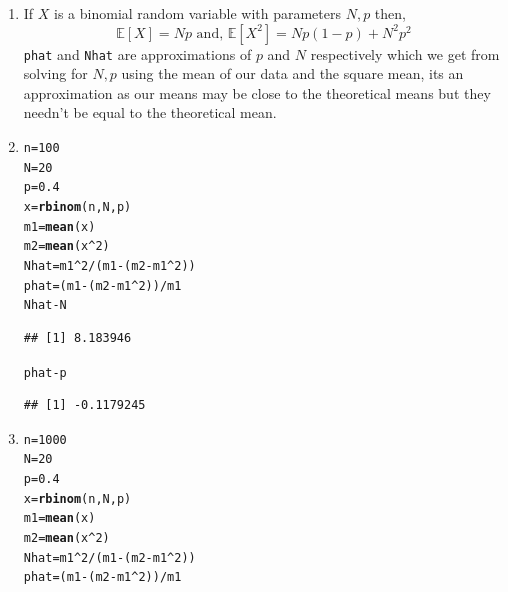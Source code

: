 \documentclass[11pt]{article}\usepackage[]{graphicx}\usepackage[dvipsnames]{xcolor}
\makeatletter
\newcommand{\hlnum}[1]{\textcolor[rgb]{0.686,0.059,0.569}{#1}}%
\newcommand{\hlopt}[1]{\textcolor[rgb]{0,0,0}{#1}}%
\newcommand{\hldef}[1]{\textcolor[rgb]{0.345,0.345,0.345}{#1}}%
\newcommand{\hlkwb}[1]{\textcolor[rgb]{0.69,0.353,0.396}{#1}}%
\newcommand{\hlkwd}[1]{\textcolor[rgb]{0.737,0.353,0.396}{\textbf{#1}}}%
\newenvironment{kframe}{%
 \def\at@end@of@kframe{}%
 \ifinner\ifhmode%
  \def\at@end@of@kframe{\end{minipage}}%
  \begin{minipage}{\columnwidth}%
 \fi\fi%
 \def\FrameCommand##1{\hskip\@totalleftmargin \hskip-\fboxsep
 \colorbox{shadecolor}{##1}\hskip-\fboxsep
     \hskip-\linewidth \hskip-\@totalleftmargin \hskip\columnwidth}%
 \MakeFramed {\advance\hsize-\width
   \@totalleftmargin\z@ \linewidth\hsize
   \@setminipage}}%
 {\par\unskip\endMakeFramed%
 \at@end@of@kframe}
\newenvironment{knitrout}{}{} %
\theoremstyle{problemstyle}
\makeatother
\begin{document}
\begin{enumerate}[label=\arabic*.]
\begin{enumerate}[label=(\alph*)]
        \item[(0)] If $X$ is a binomial random variable with parameters $N,p$ then,
        $$\mathbb{E}[X]=Np\text{ and, }\mathbb{E}[X^2]=Np(1-p)+N^2p^2$$
        \texttt{phat} and \texttt{Nhat} are approximations of $p$ and $N$ respectively which we get from solving for $N,p$ using the mean of our data and the square mean, its an approximation as our means may be close to the theoretical means but they needn't be equal to the theoretical mean.
        \item 
\begin{knitrout}
\color{fgcolor}\begin{kframe}
\begin{alltt}
\hldef{n} \hlkwb{=} \hlnum{100}
\hldef{N} \hlkwb{=} \hlnum{20}
\hldef{p} \hlkwb{=} \hlnum{0.4}
\hldef{x} \hlkwb{=} \hlkwd{rbinom}\hldef{(n,N,p)}
\hldef{m1} \hlkwb{=} \hlkwd{mean}\hldef{(x)}
\hldef{m2} \hlkwb{=} \hlkwd{mean}\hldef{(x}\hlopt{^}\hlnum{2}\hldef{)}
\hldef{Nhat} \hlkwb{=} \hldef{m1}\hlopt{^}\hlnum{2} \hlopt{/} \hldef{(m1} \hlopt{-} \hldef{(m2} \hlopt{-} \hldef{m1}\hlopt{^}\hlnum{2}\hldef{))}
\hldef{phat} \hlkwb{=} \hldef{(m1} \hlopt{-} \hldef{(m2} \hlopt{-} \hldef{m1}\hlopt{^}\hlnum{2}\hldef{))} \hlopt{/} \hldef{m1}
\hldef{Nhat} \hlopt{-} \hldef{N}
\end{alltt}
\begin{verbatim}
## [1] 8.183946
\end{verbatim}
\begin{alltt}
\hldef{phat} \hlopt{-} \hldef{p}
\end{alltt}
\begin{verbatim}
## [1] -0.1179245
\end{verbatim}
\end{kframe}
\end{knitrout}
        \item 
\begin{knitrout}
\color{fgcolor}\begin{kframe}
\begin{alltt}
\hldef{n} \hlkwb{=} \hlnum{1000}
\hldef{N} \hlkwb{=} \hlnum{20}
\hldef{p} \hlkwb{=} \hlnum{0.4}
\hldef{x} \hlkwb{=} \hlkwd{rbinom}\hldef{(n,N,p)}
\hldef{m1} \hlkwb{=} \hlkwd{mean}\hldef{(x)}
\hldef{m2} \hlkwb{=} \hlkwd{mean}\hldef{(x}\hlopt{^}\hlnum{2}\hldef{)}
\hldef{Nhat} \hlkwb{=} \hldef{m1}\hlopt{^}\hlnum{2} \hlopt{/} \hldef{(m1} \hlopt{-} \hldef{(m2} \hlopt{-} \hldef{m1}\hlopt{^}\hlnum{2}\hldef{))}
\hldef{phat} \hlkwb{=} \hldef{(m1} \hlopt{-} \hldef{(m2} \hlopt{-} \hldef{m1}\hlopt{^}\hlnum{2}\hldef{))} \hlopt{/} \hldef{m1}

\end{alltt}
\end{kframe}
\end{knitrout}
\end{enumerate}
\end{enumerate}
\end{document}
